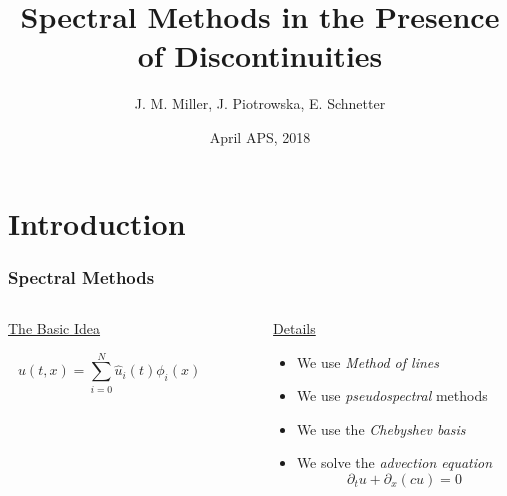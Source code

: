 \documentclass[9pt,usepdftitle=false,aspectratio=169]{beamer}
\title[Spectral Discontinuities]{Spectral Methods in the Presence of Discontinuities}
\author[Co-Design Summer School]{
  J. M. Miller,
  {\texorpdfstring{\color{blue}}{}J. Piotrowska},
  E. Schnetter}
\institute[LANL]{\color{blue}Los Alamos National Laboratory}
\date[April APS]{\color{black}April APS, 2018}
\begin{document}
\section{Introduction}
\begin{frame}[plain]
  \titlepage
\end{frame}

\begin{frame}
  \frametitle{Spectral Methods}
  \begin{columns}
    \begin{column}{0.5\textwidth}
      \begin{center}
        \underline{\huge\color{blue}The Basic Idea}\\
        \vspace{0.75cm}
        \begin{huge}
          $$u(t,x) = \sum_{i=0}^N\hat{u}_i(t)\phi_i(x)$$
        \end{huge}
        \vspace{2cm}
      \end{center}
    \end{column}
    \vrule{}
    \begin{column}{0.05\textwidth}\end{column}
    \begin{column}{0.45\textwidth}
      \begin{center}
        \underline{\huge\color{red}Details}
      \end{center}
      \vspace{1.2cm}
      \begin{itemize}
      \item We use \textit{Method of lines}
      \item We use \textit{pseudospectral} methods
      \item We use the \textit{Chebyshev basis}
      \item We solve the \textit{advection equation}
        { \huge
          $$\partial_t u + \partial_x (c u) = 0 $$
        }
      \end{itemize}
      \vspace{1cm}
    \end{column}
  \end{columns}
\end{frame}
\end{document}
